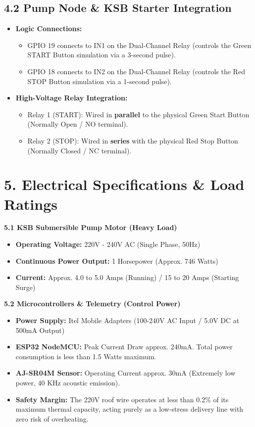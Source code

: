 \documentclass[11pt, a4paper]{article}
\begin{document}
\subsection*{4.2 Pump Node \& KSB Starter Integration}
\begin{itemize}
    \item \textbf{Logic Connections:} 
    \begin{itemize}
        \item GPIO 19 connects to IN1 on the Dual-Channel Relay (controls the Green START Button simulation via a 3-second pulse).
        \item GPIO 18 connects to IN2 on the Dual-Channel Relay (controls the Red STOP Button simulation via a 1-second pulse).
    \end{itemize}
    \item \textbf{High-Voltage Relay Integration:}
    \begin{itemize}
        \item Relay 1 (START): Wired in \textbf{parallel} to the physical Green Start Button (Normally Open / NO terminal).
        \item Relay 2 (STOP): Wired in \textbf{series} with the physical Red Stop Button (Normally Closed / NC terminal).
    \end{itemize}
\end{itemize}

\section*{5. Electrical Specifications \& Load Ratings}

\textbf{5.1 KSB Submersible Pump Motor (Heavy Load)}
\begin{itemize}
    \item \textbf{Operating Voltage:} 220V - 240V AC (Single Phase, 50Hz)
    \item \textbf{Continuous Power Output:} 1 Horsepower (Approx. 746 Watts)
    \item \textbf{Current:} Approx. 4.0 to 5.0 Amps (Running) / 15 to 20 Amps (Starting Surge)
\end{itemize}

\textbf{5.2 Microcontrollers \& Telemetry (Control Power)}
\begin{itemize}
    \item \textbf{Power Supply:} Itel Mobile Adapters (100-240V AC Input / 5.0V DC at 500mA Output)
    \item \textbf{ESP32 NodeMCU:} Peak Current Draw approx. 240mA. Total power consumption is less than 1.5 Watts maximum.
    \item \textbf{AJ-SR04M Sensor:} Operating Current approx. 30mA (Extremely low power, 40 KHz acoustic emission).
    \item \textbf{Safety Margin:} The 220V roof wire operates at less than 0.2\% of its maximum thermal capacity, acting purely as a low-stress delivery line with zero risk of overheating.
\end{itemize}
\end{document}
